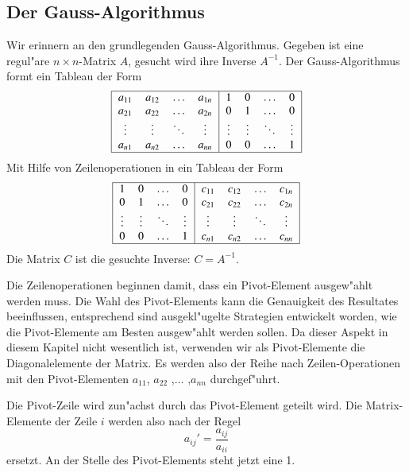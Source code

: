 \subsection{Der Gauss-Algorithmus}
Wir erinnern an den grundlegenden Gauss-Algorithmus.
Gegeben ist eine regul"are
$n\times n$-Matrix $A$, gesucht wird ihre Inverse $A^{-1}$.
Der Gauss-Algorithmus formt ein Tableau der Form
\begin{equation}
\begin{tabular}{|>{$}c<{$}>{$}c<{$}>{$}c<{$}>{$}c<{$}|>{$}c<{$}>{$}c<{$}>{$}c<{$}>{$}c<{$}|}
\hline
a_{11}&a_{12}&\dots &a_{1n}&1     &0     &\dots &0\\
a_{21}&a_{22}&\dots &a_{2n}&0     &1     &\dots &0\\
\vdots&\vdots&\ddots&\vdots&\vdots&\vdots&\ddots&\vdots\\
a_{n1}&a_{n2}&\dots &a_{nn}&0     &0     &\dots &1\\
\hline
\end{tabular}
\label{starttableau}
\end{equation}
Mit Hilfe von Zeilenoperationen in ein Tableau der Form
\begin{equation}
\begin{tabular}{|>{$}c<{$}>{$}c<{$}>{$}c<{$}>{$}c<{$}|>{$}c<{$}>{$}c<{$}>{$}c<{$}>{$}c<{$}|}
\hline
1     &0     &\dots &0     & c_{11}&c_{12}&\dots &c_{1n}\\
0     &1     &\dots &0     & c_{21}&c_{22}&\dots &c_{2n}\\
\vdots&\vdots&\ddots&\vdots& \vdots&\vdots&\ddots&\vdots\\
0     &0     &\dots &1     & c_{n1}&c_{n2}&\dots &c_{nn}\\
\hline
\end{tabular}
\label{targettableau}
\end{equation}
Die Matrix $C$ ist die gesuchte Inverse: $C=A^{-1}$.

Die Zeilenoperationen beginnen damit, dass ein Pivot-Element ausgew"ahlt
werden muss.
Die Wahl des Pivot-Elements kann die Genauigkeit des Resultates beeinflussen,
entsprechend sind ausgekl"ugelte Strategien entwickelt worden, wie die
Pivot-Elemente am Besten ausgew"ahlt werden sollen. Da dieser Aspekt in
diesem Kapitel nicht wesentlich ist, verwenden wir als Pivot-Elemente die
Diagonalelemente der Matrix. Es werden also der Reihe nach Zeilen-Operationen
mit den Pivot-Elementen $a_{11}$, $a_{22}$ ,$\dots$ ,$a_{nn}$ 
durchgef"uhrt.

Die Pivot-Zeile wird zun"achst durch das
Pivot-Element geteilt wird. Die Matrix-Elemente der Zeile $i$ werden
also nach der Regel
\begin{equation}
a_{ij}'=\frac{a_{ij}}{a_{ii}}
\label{red}
\end{equation}
ersetzt.
An der Stelle des Pivot-Elements steht jetzt eine 1.


